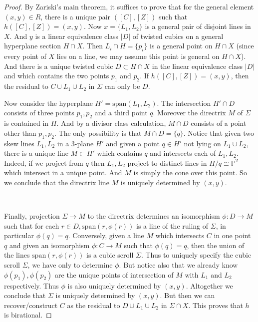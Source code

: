\documentclass[amssymb,twoside,12 pt,amscd,reqno]{amsart}
\theoremstyle{plain}
\theoremstyle{definition}
\newcommand{\PP}{\mathbb{P}}
\def\ps{\vspace{4pt}}
\begin{document}
\begin{proof}  By Zariski's main theorem, it suffices to prove that
for the general element $(x,y)\in R$, there is a unique pair
$([C],[Z])$ such that $h([C],[Z])=(x,y)$.  Now $x=\{L_1,L_2\}$ is a
general pair of disjoint lines in $X$.  And $y$ is a linear
equivalence class $|D|$ of twisted cubics on a general hyperplane
section $H\cap X$.  Then $L_i\cap H=\{p_i\}$ is a general point on $H\cap X$
(since every point of $X$ lies on a line, we may assume this point is
general on $H\cap X$).  And there is a unique twisted cubic $D\subset
H\cap X$ in the linear equivalence class $|D|$ and which contains the
two points $p_1$ and $p_2$.  If $h([C],[Z])=(x,y)$, then the residual
to $C\cup L_1\cup L_2$ in $\Sigma$ can only be $D$.  

\ps

Now consider the hyperplane $H'=\text{span}(L_1,L_2)$.  The
intersection $H'\cap D$ consists of three points $p_1,p_2$ and a third
point $q$.  Moreover the directrix $M$ of $\Sigma$ is contained in
$H$.  And by a divisor class calculation, $M\cap D$ consists of a
point other than $p_1, p_2$.  The only possibility is that $M\cap D =
\{q\}$.  Notice that given two skew lines $L_1, L_2$ in a $3$-plane
$H'$ and given a point $q\in H'$ not lying on $L_1\cup L_2$, there is
a unique line $M\subset H'$ which contains $q$ and intersects each of
$L_1,L_2$.  Indeed, if we project from $q$ then $L_1,L_2$ project to
distinct lines in $H/q\cong \PP^2$ which intersect in a unique point.
And $M$ is simply the cone over this point.  So we conclude that the
directrix line $M$ is uniquely determined by $(x,y)$.  

\

Finally, projection $\Sigma\rightarrow M$ to the directrix determines
an isomorphism 
$\phi:D\rightarrow M$ such that for each $r\in D,
\text{span}(r,\phi(r))$ is a line of the ruling of $\Sigma$, in
particular $\phi(q)=q$.  Conversely, given a line $M$ which intersects
$C$ in one point $q$ and given an isomorphism $\phi:C\rightarrow M$
such that $\phi(q)=q$, then the union of the lines
$\text{span}(r,\phi(r))$ is a cubic scroll $\Sigma$.  Thus to uniquely
specify the cubic scroll $\Sigma$, we have only to determine $\phi$.
But notice also that we already know $\phi(p_1),\phi(p_2)$ are the
unique points of intersection of $M$ with $L_1$ and $L_2$
respectively.  Thus $\phi$ is also uniquely determined by $(x,y)$.
Altogether we conclude that $\Sigma$ is uniquely determined by
$(x,y)$.  But then we can recover/construct $C$ as the residual to
$D\cup L_1\cup L_2$ in $\Sigma\cap X$.  This proves that $h$ is
birational.
\end{proof}
\end{document}
